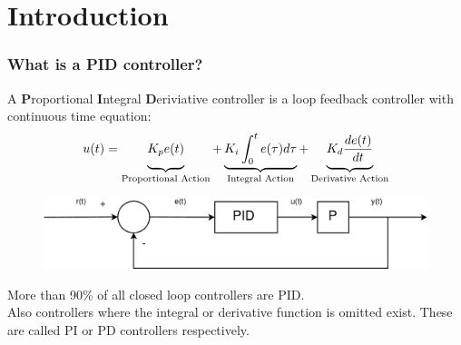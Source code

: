 


\section{Introduction}

\begin{frame}
	\frametitle{What is a PID controller?}
	\small{
	\begin{definition}
		A \textbf{P}roportional \textbf{I}ntegral \textbf{D}eriviative controller is a loop feedback controller with continuous time equation:
		\vspace{-1em}
		\begin{equation*}
			u(t) = 	\underbrace{\vphantom{\int^t_0e(\tau)d\tau}K_p e(t)}_\text{Proportional Action} 
					+ \underbrace{K_i\int^t_0e(\tau)d\tau}_\text{Integral Action} 
					+ \underbrace{\vphantom{\int^t_0e(\tau)d\tau} K_d \frac{de(t)}{dt}}_\text{Derivative Action}
		\end{equation*}
		\vspace{-1.5em}
		\begin{figure}
			\centering
			\includegraphics[width=0.8\linewidth]{img/PID}
		\end{figure}
	\end{definition}
	
	More than 90\% of all closed loop controllers are PID.\\
	Also controllers where the integral or derivative function is omitted exist. These are called PI or PD controllers respectively.}
\end{frame}

